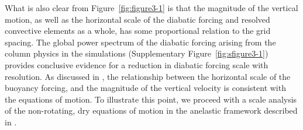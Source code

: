 What is also clear from Figure~\ref{fig:figure3-1} is that the magnitude of the vertical motion, as well as the horizontal scale of the diabatic forcing and resolved convective elements as a whole, has some proportional relation to the grid spacing. The global power spectrum of the diabatic forcing arising from the column physics in the simulations (Supplementary Figure~\ref{fig:sfigure3-1}) provides conclusive evidence for a reduction in diabatic forcing scale with resolution. As discussed in \cite{HR2017JCLIM}, the relationship between the horizontal scale of the buoyancy forcing, and the magnitude of the vertical velocity is consistent with the equations of motion. To illustrate this point, we proceed with a scale analysis of the non-rotating, dry equations of motion in the anelastic framework described in \cite{JR2016QJRMS}.

